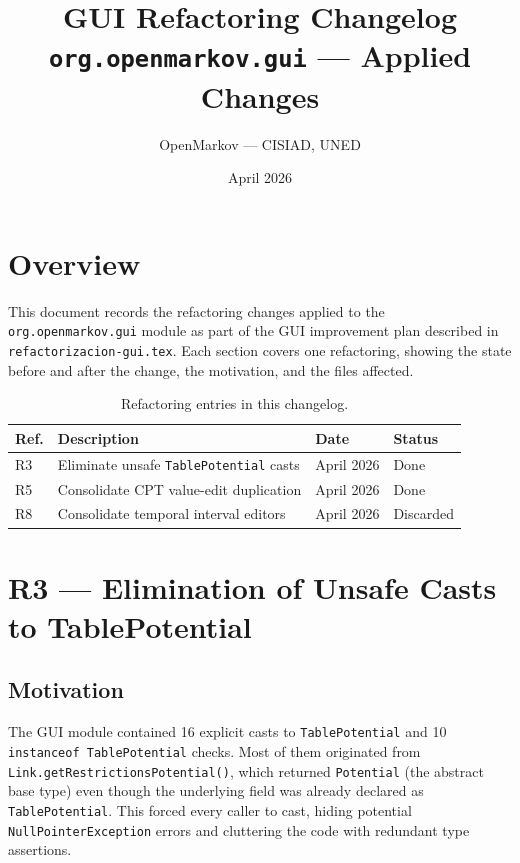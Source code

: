 \documentclass[12pt,a4paper]{article}
\title{GUI Refactoring Changelog \\
       \large \texttt{org.openmarkov.gui} --- Applied Changes}
\author{OpenMarkov --- CISIAD, UNED}
\date{April 2026}
\newcommand{\code}[1]{\texttt{#1}}
\newcommand{\cls}[1]{\texttt{#1}}
\newcommand{\meth}[1]{\texttt{#1}}
\newcommand{\pkg}[1]{\texttt{#1}}
\newcommand{\file}[1]{\texttt{#1}}
\begin{document}
\maketitle
\tableofcontents
\newpage

\section{Overview}
\label{sec:overview}

This document records the refactoring changes applied to the
\pkg{org.openmarkov.gui} module as part of the GUI improvement plan
described in \file{refactorizacion-gui.tex}. Each section covers one
refactoring, showing the state before and after the change, the
motivation, and the files affected.

\begin{table}[H]
\centering
\small
\begin{tabular}{llll}
\toprule
\textbf{Ref.} & \textbf{Description} & \textbf{Date} & \textbf{Status} \\
\midrule
R3 & Eliminate unsafe \cls{TablePotential} casts & April 2026 & Done \\
R5 & Consolidate CPT value-edit duplication       & April 2026 & Done \\
R8 & Consolidate temporal interval editors        & April 2026 & Discarded \\
\bottomrule
\end{tabular}
\caption{Refactoring entries in this changelog.}
\label{tab:overview}
\end{table}

\section{R3 --- Elimination of Unsafe Casts to TablePotential}
\label{sec:r3}

\subsection{Motivation}

The GUI module contained 16 explicit casts to \cls{TablePotential} and
10 \code{instanceof TablePotential} checks. Most of them originated
from \meth{Link.getRestrictionsPotential()}, which returned
\cls{Potential} (the abstract base type) even though the underlying
field was already declared as \cls{TablePotential}. This forced every
caller to cast, hiding potential \code{NullPointerException} errors
and cluttering the code with redundant type assertions.
\end{document}
